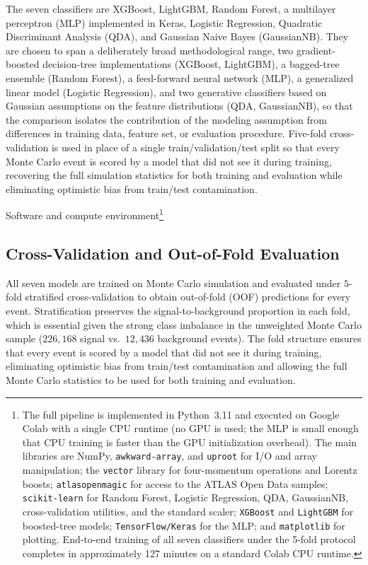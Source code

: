\documentclass[conference]{IEEEtran}
\begin{document}
{The seven classifiers are XGBoost, LightGBM, Random Forest, a multilayer perceptron (MLP) implemented in Keras, Logistic Regression, Quadratic Discriminant Analysis (QDA), and Gaussian Naive Bayes (GaussianNB). They are chosen to span a deliberately broad methodological range, two gradient-boosted decision-tree implementations (XGBoost, LightGBM), a bagged-tree ensemble (Random Forest), a feed-forward neural network (MLP), a generalized linear model (Logistic Regression), and two generative classifiers based on Gaussian assumptions on the feature distributions (QDA, GaussianNB), so that the comparison isolates the contribution of the modeling assumption from differences in training data, feature set, or evaluation procedure. Five-fold cross-validation is used in place of a single train/validation/test split so that every Monte Carlo event is scored by a model that did not see it during training, recovering the full simulation statistics for both training and evaluation while eliminating optimistic bias from train/test contamination.

Software and compute environment\footnote{The full pipeline is implemented in Python~3.11 and executed on Google Colab with a single CPU runtime (no GPU is used; the MLP is small enough that CPU training is faster than the GPU initialization overhead). The main libraries are NumPy, \texttt{awkward-array}, and \texttt{uproot} for I/O and array manipulation; the \texttt{vector} library for four-momentum operations and Lorentz boosts; \texttt{atlasopenmagic} for access to the ATLAS Open Data samples; \texttt{scikit-learn} for Random Forest, Logistic Regression, QDA, GaussianNB, cross-validation utilities, and the standard scaler; \texttt{XGBoost} and \texttt{LightGBM} for boosted-tree models; \texttt{TensorFlow/Keras} for the MLP; and \texttt{matplotlib} for plotting. End-to-end training of all seven classifiers under the 5-fold protocol completes in approximately 127 minutes on a standard Colab CPU runtime.}

\subsection{Cross-Validation and Out-of-Fold Evaluation}
 
All seven models are trained on Monte Carlo simulation and
evaluated under $5$-fold stratified cross-validation to obtain
out-of-fold (OOF) predictions for every event. Stratification
preserves the signal-to-background proportion in each fold,
which is essential given the strong class imbalance in the
unweighted Monte Carlo sample ($226{,}168$ signal vs.\ $12{,}436$
background events). The fold structure ensures that every event
is scored by a model that did not see it during training,
eliminating optimistic bias from train/test contamination and
allowing the full Monte Carlo statistics to be used for both
training and evaluation.
 
}
\end{document}
